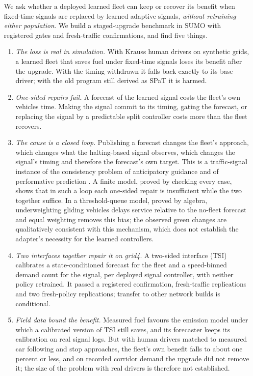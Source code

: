 We ask whether a deployed learned fleet can keep or recover its benefit when fixed-time signals are replaced by learned adaptive signals,
\emph{without retraining either population}. We build a staged-upgrade benchmark in SUMO \cite{lopez2018} with registered gates and
fresh-traffic confirmations, and find five things.
\begin{enumerate}\setlength\itemsep{1pt}
\item \emph{The loss is real in simulation.} With Krauss human drivers on synthetic grids, a learned fleet that saves fuel under fixed-time signals loses its benefit after the upgrade. With the
timing withdrawn it falls back exactly to its base driver; with the old program still derived as SPaT it is harmed.
\item \emph{One-sided repairs fail.} A forecast of the learned signal costs the fleet's own vehicles time. Making the signal commit to
its timing, gating the forecast, or replacing the signal by a predictable split controller costs more than the fleet recovers.
\item \emph{The cause is a closed loop.} Publishing a forecast changes the fleet's approach, which changes what the halting-based signal
observes, which changes the signal's timing and therefore the forecast's own target. This is a traffic-signal instance of the consistency
problem of anticipatory guidance \cite{bottom2000} and of performative prediction \cite{perdomo2020,narang2023}. A finite model, proved by
checking every case, shows that in such a loop each one-sided repair is insufficient while the two together suffice. In a threshold-queue model, proved by algebra, underweighting gliding vehicles delays service relative to the no-fleet forecast and equal weighting removes this bias; the observed green changes are qualitatively consistent with this mechanism, which does not establish the adapter's necessity for the learned controllers.
\item \emph{Two interfaces together repair it on grid4.} A two-sided interface (TSI) calibrates a state-conditioned forecast for
the fleet and a speed-binned demand count for the signal, per deployed signal controller, with neither policy retrained. It passed a
registered confirmation, fresh-traffic replications and two fresh-policy replications; transfer to other network builds is conditional.
\item \emph{Field data bound the benefit.} Measured fuel favours the emission model under which a calibrated version of TSI still saves, and
its forecaster keeps its calibration on real signal logs. But with human drivers matched to measured car following and stop approaches, the
fleet's own benefit falls to about one percent or less, and on recorded corridor demand the upgrade did not remove it; the size of the
problem with real drivers is therefore not established.
\end{enumerate}

